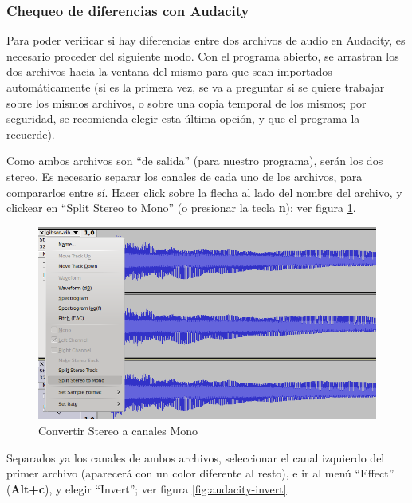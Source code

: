 \subsubsection{Chequeo de diferencias con Audacity}
\label{subsec:chequeo-diferencias}
Para poder verificar si hay diferencias entre dos archivos de audio en Audacity, es necesario proceder del siguiente modo. Con el programa abierto, se arrastran los dos archivos hacia la ventana del mismo para que sean importados automáticamente (si es la primera vez, se va a preguntar si se quiere trabajar sobre los mismos archivos, o sobre una copia temporal de los mismos; por seguridad, se recomienda elegir esta última opción, y que el programa la recuerde).\vspace{\baselineskip}

Como ambos archivos son ``de salida'' (para nuestro programa), serán los dos stereo. Es necesario separar los canales de cada uno de los archivos, para compararlos entre sí. Hacer click sobre la flecha al lado del nombre del archivo, y clickear en ``Split Stereo to Mono'' (o presionar la tecla \textbf{n}); ver figura \ref{fig:audacity-split-stereo}.


\begin{figure}[H]
    \centering
    \includegraphics[scale=0.70]{imagenes/audacity-split-stereo.png}
    \caption{Convertir Stereo a canales Mono}
    \label{fig:audacity-split-stereo}
\end{figure}


Separados ya los canales de ambos archivos, seleccionar el canal izquierdo del primer archivo (aparecerá con un color diferente al resto), e ir al menú ``Effect'' (\textbf{Alt+c}), y elegir ``Invert''; ver figura \ref{fig:audacity-invert}.\vspace{\baselineskip}

